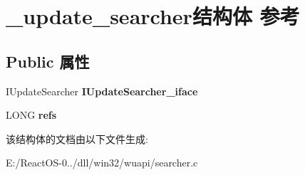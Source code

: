 \hypertarget{struct__update__searcher}{}\section{\+\_\+update\+\_\+searcher结构体 参考}
\label{struct__update__searcher}
\subsection*{Public 属性}
\begin{DoxyCompactItemize}
\item 
\mbox{\label{struct__update__searcher_afc39b5514f5ca5dc55694b8384366e52}} 
I\+Update\+Searcher {\bfseries I\+Update\+Searcher\+\_\+iface}
\item 
\mbox{\label{struct__update__searcher_ae69bf6ea7eb5ef929980e1544f7a9801}} 
L\+O\+NG {\bfseries refs}
\end{DoxyCompactItemize}


该结构体的文档由以下文件生成\+:\begin{DoxyCompactItemize}
\item 
E\+:/\+React\+O\+S-\/0../dll/win32/wuapi/searcher.\+c\end{DoxyCompactItemize}
